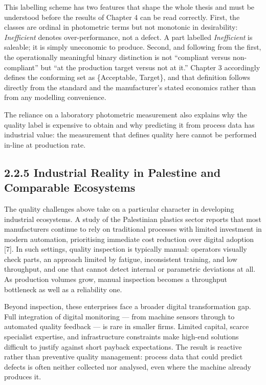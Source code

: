 This labelling scheme has two features that shape the whole thesis and must be understood before the results of Chapter 4 can be read correctly. First, the classes are ordinal in photometric terms but not monotonic in desirability: \emph{Inefficient} denotes over-performance, not a defect. A part labelled \emph{Inefficient} is saleable; it is simply uneconomic to produce. Second, and following from the first, the operationally meaningful binary distinction is not ``compliant versus non-compliant'' but ``at the production target versus not at it.'' Chapter 3 accordingly defines the conforming set as \{Acceptable, Target\}, and that definition follows directly from the standard and the manufacturer's stated economics rather than from any modelling convenience.

The reliance on a laboratory photometric measurement also explains why the quality label is expensive to obtain and why predicting it from process data has industrial value: the measurement that defines quality here cannot be performed in-line at production rate.

\hypertarget{industrial-reality-in-palestine-and-comparable-ecosystems}{%
\subsection{2.2.5 Industrial Reality in Palestine and Comparable Ecosystems}\label{industrial-reality-in-palestine-and-comparable-ecosystems}}

The quality challenges above take on a particular character in developing industrial ecosystems. A study of the Palestinian plastics sector reports that most manufacturers continue to rely on traditional processes with limited investment in modern automation, prioritising immediate cost reduction over digital adoption {[}7{]}. In such settings, quality inspection is typically manual: operators visually check parts, an approach limited by fatigue, inconsistent training, and low throughput, and one that cannot detect internal or parametric deviations at all. As production volumes grow, manual inspection becomes a throughput bottleneck as well as a reliability one.

Beyond inspection, these enterprises face a broader digital transformation gap. Full integration of digital monitoring --- from machine sensors through to automated quality feedback --- is rare in smaller firms. Limited capital, scarce specialist expertise, and infrastructure constraints make high-end solutions difficult to justify against short payback expectations. The result is reactive rather than preventive quality management: process data that could predict defects is often neither collected nor analysed, even where the machine already produces it.


